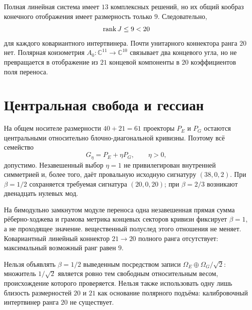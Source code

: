 Полная линейная система имеет $13$ комплексных решений, но их общий
кообраз конечного отображения имеет размерность только $9$. Следовательно,
\begin{equation}
 \operatorname{rank} J\leq9<20
 \label{eq:v8-connector-rank-bound}
\end{equation}
для каждого ковариантного интертвинера. Почти унитарного коннектора ранга
$20$ нет. Полярная коизометрия $A_0:\mathbb C^{11}\to\mathbb C^{10}$
связывает два концевого угла, но не превращается в отображение из
$21$ концевой компоненты в $20$ коэффициентов поля переноса.

\section{Центральная свобода и гессиан}

На общем носителе размерности $40+21=61$ проекторы $P_E$ и $P_G$ остаются
центральными относительно блочно-диагональной кривизны. Поэтому всё
семейство
\begin{equation}
 G_\eta=P_E+\eta P_G,
 \qquad \eta>0,
 \label{eq:v8-common-central-metric-family}
\end{equation}
допустимо. Незавешенный выбор $\eta=1$ не привилегирован внутренней
симметрией и, более того, даёт провальную исходную сигнатуру
$(38,0,2)$. При $\beta=1/2$ сохраняется требуемая сигнатура
$(20,0,20)$; при $\beta=2/3$ возникают двенадцать нулевых мод.

\begin{theorem}
На бимодульно замкнутом модуле переноса одна незавешенная прямая сумма
рёберно-ходжева и грамова метрика концевых секторов кривизн фиксирует $\beta=1$, а не проходящее
значение. вещественный полуслед этого отношения не меняет. Ковариантный линейный
коннектор $21\to20$ полного ранга отсутствует: максимальный возможный ранг
равен $9$.
\end{theorem}

\begin{nogocriterion}
Нельзя объявлять $\beta=1/2$ выведенным посредством записи
$\Omega_E\oplus\Omega_G/\sqrt2$: множитель $1/\sqrt2$ является ровно тем
свободным относительным весом, происхождение которого проверяется. Нельзя
также использовать одну лишь близость размерностей $20$ и $21$ как
основание полярного подъёма: калибровочный интертвинер ранга $20$ не существует.
\end{nogocriterion}

